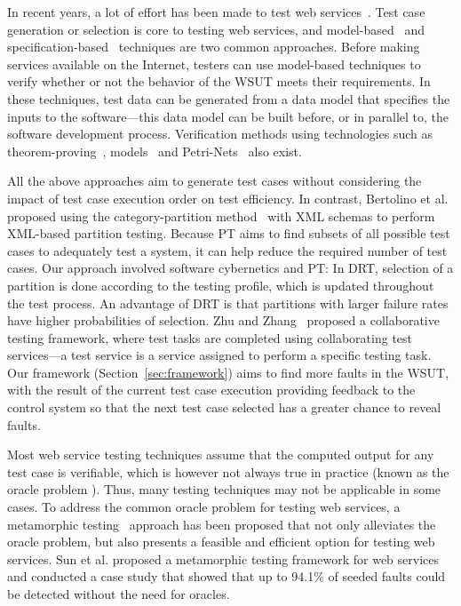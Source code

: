 \documentclass[10pt,journal,compsoc]{IEEEtran}
\begin{document}
In recent years, a lot of effort has been made to test web services~\cite{canfora, bozkurt2010, li2014two, qiu2015regression}.
Test case generation or selection is core to testing web services, and model-based~\cite{dalal1999model} and specification-based~\cite{li2009towards} techniques are two common approaches.
Before making services available on the Internet, testers can use model-based techniques to verify whether or not the behavior of the WSUT meets their requirements.
In these techniques, test data can be generated from a data model that specifies the inputs to the software---this data model can be built before, or in parallel to, the software development process.
Verification methods using technologies such as theorem-proving~\cite{sinha2006model}, models~\cite{paradkar2007} and Petri-Nets~\cite{xiang2015executable} also exist.

All the above approaches aim to generate test cases without considering the impact of test case execution order on test efficiency.
In contrast, Bertolino et al.~\cite{bertolino2007automatic} proposed using the category-partition method~\cite{Ostrand88} with XML schemas to perform XML-based partition testing.
Because PT aims to find subsets of all possible test cases to adequately test a system, it can help reduce the required number of test cases.
Our approach involved software cybernetics and PT:
In DRT, selection of a partition is done according to the testing profile, which is updated throughout the test process.
An advantage of DRT is that partitions with larger failure rates have higher probabilities of selection.
Zhu and Zhang~\cite{zhu2012collaborative} proposed a collaborative testing framework, where test tasks are completed using collaborating test services---a test service is a service assigned to perform a specific testing task.
Our framework (Section~\ref{sec:framework}) aims to find more faults in the WSUT, with the result of the current test case execution providing feedback to the control system so that the next test case selected has a greater chance to reveal faults.

Most web service testing techniques assume that the computed output for any test case is verifiable, which is however not always true in practice (known as the oracle problem \cite{barr2015oracle, patel2018mapping}). Thus, many testing techniques may not be applicable in some cases.
To address the common oracle problem for testing web services, a metamorphic testing~\cite{chen1998metamorphic,chen2018metamorphic} approach has been proposed that not only alleviates the oracle problem, but also presents a feasible and efficient option for testing web services.
Sun et al. proposed a metamorphic testing framework for web services~\cite{sun2011} and conducted a case study that showed that up to 94.1\% of seeded faults could be detected without the need for oracles.
\end{document}
